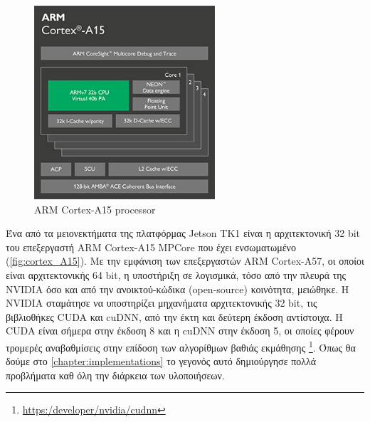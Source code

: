 \begin{figure}[!ht]
  \centering
  \includegraphics[width=0.6\textwidth]{./images/chapter4/cortex_A15_chip_diagram.png}
  \caption[ARM Cortex-A15 processor]{ARM Cortex-A15 processor}
  \label{fig:cortex_A15}
\end{figure}

Ένα από τα μειονεκτήματα της πλατφόρμας Jetson TK1 είναι η αρχιτεκτονική 32 bit του επεξεργαστή ARM Cortex-A15 MPCore
που έχει ενσωματωμένο (\autoref{fig:cortex_A15}). Με την εμφάνιση των επεξεργαστών ARM Cortex-A57, 
οι οποίοι είναι αρχιτεκτονικής 64 bit,
η υποστήριξη σε λογισμικά, τόσο από την πλευρά της NVIDIA όσο και από την ανοικτού-κώδικα (open-source) κοινότητα, μειώθηκε.
Η NVIDIA σταμάτησε να υποστηρίζει μηχανήματα αρχιτεκτονικής 32 bit, τις βιβλιοθήκες CUDA και cuDNN,
από την έκτη και δεύτερη έκδοση αντίστοιχα. Η CUDA είναι σήμερα στην έκδοση 8 και η cuDNN στην έκδοση 5,
οι οποίες φέρουν τρομερές αναβαθμίσεις στην επίδοση των αλγορίθμων βαθιάς εκμάθησης
\footnote{\href{https:/developer/nvidia/cudnn}{https:/developer/nvidia/cudnn}}.
Όπως θα δούμε στο \autoref{chapter:implementations} το γεγονός αυτό δημιούργησε πολλά
προβλήματα καθ όλη την διάρκεια των υλοποιήσεων.
